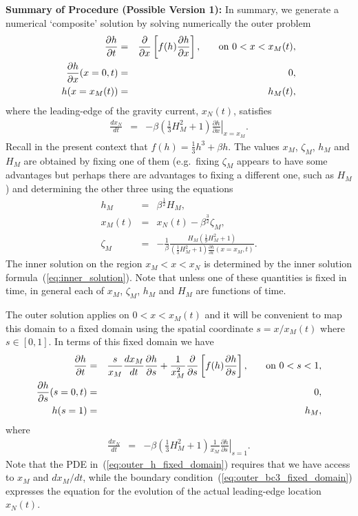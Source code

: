 \documentclass[11pt]{article}
\newcommand{\bea}{\begin{eqnarray}}
\newcommand{\eea}{\end{eqnarray}}
\begin{document}
{\bf Summary of Procedure (Possible Version 1):} In summary, we generate a numerical `composite' solution by solving numerically the outer problem
\bea
\label{eq:outer_h}
\frac{\partial h}{\partial t} & = & \frac{\partial}{\partial x} \left[ f(h)\frac{\partial h}{\partial x} \right], \hspace{0.25in} \mbox{on $0 < x < x_M(t)$},\\
\label{eq:outer_bc1}
\frac{\partial h}{\partial x}(x=0,t) & = & 0,\\
\label{eq:outer_bc2}
h(x=x_M(t)) & = & h_M(t),
\eea
where the leading-edge of the gravity current, $x_N(t)$, satisfies
\bea
\label{eq:outer_bc3}
\frac{dx_N}{dt} & = & - \beta \left( \frac{1}{3} H^2_M + 1 \right) \left. \frac{\partial h}{\partial x} \right|_{x=x_M}.
\eea
Recall in the present context that $f(h) = \frac{1}{3} h^3 + \beta h$.
The values $x_M$, $\zeta_M$, $h_M$ and $H_M$ are obtained by fixing one of them (e.g.~fixing $\zeta_M$ appears to have some advantages but perhaps there are advantages to fixing a different one, such as $H_M$) and determining the other three using the equations
\bea
\label{eq:hM}
h_M & = & \beta^{\frac{1}{2}} H_M, \\
\label{eq:xM}
x_M(t) & = & x_N(t) - \beta^{\frac{3}{2}} \zeta_M,\\
\label{eq:zM}
\zeta_M & = & - \frac{1}{\beta} \frac{H_M \left( \frac{1}{9} H_M^2 + 1 \right) }{ \left( \frac{1}{3} H_M^2 + 1 \right) \frac{\partial h}{\partial x}(x=x_M,t) }.
\eea
The inner solution on the region $x_M < x < x_N$ is determined by the inner solution formula~(\ref{eq:inner_solution}).  Note that unless one of these quantities is fixed in time, 
in general each of $x_M$, $\zeta_M$, $h_M$ and $H_M$ are functions of time.

The outer solution applies on $0 < x < x_M(t)$ and it will be convenient to map this domain to a fixed domain using the spatial coordinate $s=x/x_M(t)$ where $s \in [0,1]$.  In terms of this fixed domain we have
\bea
\label{eq:outer_h_fixed_domain}
\frac{\partial h}{\partial t} & = & \frac{s}{x_M} \frac{dx_M}{dt} \frac{\partial h}{\partial s} + \frac{1}{x_M^2} \frac{\partial}{\partial s} \left[ f(h)\frac{\partial h}{\partial s} \right], \hspace{0.25in} \mbox{on $0 < s < 1$},\\
\label{eq:outer_bc1_fixed_domain}
\frac{\partial h}{\partial s}(s=0,t) & = & 0,\\
\label{eq:outer_bc2_fixed_domain}
h(s=1) & = & h_M,
\eea
where
\bea
\label{eq:outer_bc3_fixed_domain}
\frac{dx_N}{dt} & = & - \beta \left( \frac{1}{3} H^2_M + 1 \right) \frac{1}{x_M} \left. \frac{\partial h}{\partial s} \right|_{s=1}.
\eea
Note that the PDE in~(\ref{eq:outer_h_fixed_domain}) requires that we have access to $x_M$ and $dx_M/dt$, while the boundary condition~(\ref{eq:outer_bc3_fixed_domain}) 
expresses the equation for the evolution of the actual leading-edge location $x_N(t)$.
\end{document}
